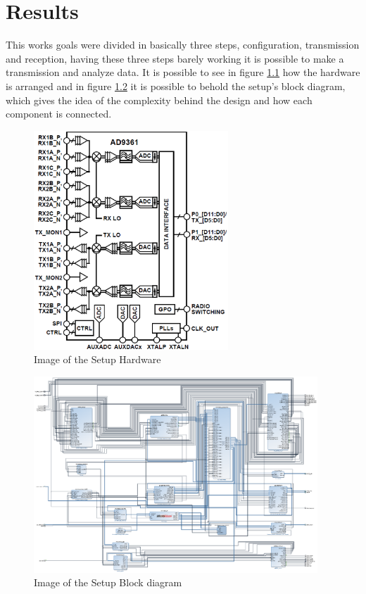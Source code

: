 \chapter{Results}
\label{chap:results}
This works goals were divided in basically three steps, configuration, transmission
and reception, having these three steps barely working it is possible to make a
transmission and analyze data. It is possible to see in figure \ref{fig:setup}
how the hardware is arranged and in figure \ref{fig:setupbd} it is possible to
behold the setup's block diagram, which gives the idea of the complexity behind
the design and how each component is connected.

\begin{figure}[htbp]
    \centering
    \includegraphics[width=0.65\textwidth]{./figures/ad9361_functional_diagram}
    \caption{ Image of the Setup Hardware
    \label{fig:setup}}
\end{figure}

\begin{figure}[htbp]
    \centering
    \includegraphics[width=0.95\textwidth]{./figures/setup_bd}
    \caption{ Image of the Setup Block diagram
    \label{fig:setupbd}}
\end{figure}

